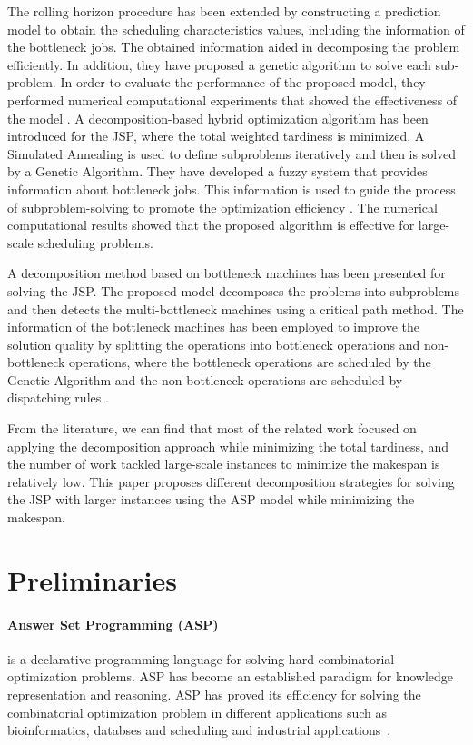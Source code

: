\documentclass{tlp} %
\begin{document}
The rolling horizon procedure has been extended by constructing a prediction model to obtain the scheduling characteristics values, including the information of the bottleneck jobs. The obtained information aided in decomposing the problem efficiently. In addition, they have proposed a genetic algorithm to solve each sub-problem. In order to evaluate the performance of the proposed model, they performed numerical computational experiments that showed the effectiveness of the model \cite{liu2008prediction}. A decomposition-based hybrid optimization algorithm has been introduced for the JSP, where the total weighted tardiness is minimized. A Simulated Annealing is used to define subproblems iteratively and then is solved by a Genetic Algorithm. They have developed a fuzzy system that provides information about bottleneck jobs. This information is used to guide the process of subproblem-solving to promote the optimization efficiency \cite{zhang2010hybrid}. The numerical computational results showed that the proposed algorithm is effective for large-scale scheduling problems.

A decomposition method based on bottleneck machines has been presented for solving the JSP. The proposed model decomposes the problems into subproblems and then detects the multi-bottleneck machines using a critical path method. The information of the bottleneck machines has been employed to improve the solution quality by splitting the operations into bottleneck operations and non-bottleneck operations, where the bottleneck operations are scheduled by the Genetic Algorithm and the non-bottleneck operations are scheduled by dispatching rules \cite{zhai2014decomposition}.

From the literature, we can find that most of the related work focused on applying the decomposition approach while minimizing the total tardiness, and the number of work tackled large-scale instances to minimize the makespan is relatively low. This paper proposes different decomposition strategies for solving the JSP with larger instances using the ASP model while minimizing the makespan.

\section{Preliminaries}
\paragraph{Answer Set Programming (ASP)} is a declarative programming language for solving hard combinatorial optimization problems. ASP has become an established paradigm for knowledge representation and reasoning. ASP has proved its efficiency for solving the combinatorial optimization problem in different applications such as bioinformatics\cite{erdem2015generating,koponen2015optimizing}, databses\cite{caniupan2010consistency} and scheduling and industrial applications~\cite{dodaro2015allotment,dodaro2016combining,fabricius2020towards,dodaro2021operating}.
\end{document}
